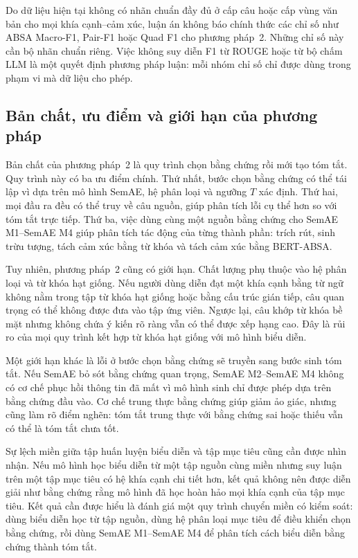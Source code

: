 Do dữ liệu hiện tại không có nhãn chuẩn đầy đủ ở cấp câu hoặc cấp vùng văn bản cho mọi khía cạnh--cảm xúc, luận án không báo chính thức các chỉ số như ABSA Macro-F1, Pair-F1 hoặc Quad F1 cho phương pháp~2. Những chỉ số này cần bộ nhãn chuẩn riêng. Việc không suy diễn F1 từ ROUGE hoặc từ bộ chấm LLM là một quyết định phương pháp luận: mỗi nhóm chỉ số chỉ được dùng trong phạm vi mà dữ liệu cho phép.

\subsection{Bản chất, ưu điểm và giới hạn của phương pháp}
\label{subsec:method2-value-limitations}

Bản chất của phương pháp~2 là quy trình chọn bằng chứng rồi mới tạo tóm tắt. Quy trình này có ba ưu điểm chính. Thứ nhất, bước chọn bằng chứng có thể tái lập vì dựa trên mô hình SemAE, hệ phân loại và ngưỡng \(T\) xác định. Thứ hai, mọi đầu ra đều có thể truy về câu nguồn, giúp phân tích lỗi cụ thể hơn so với tóm tắt trực tiếp. Thứ ba, việc dùng cùng một nguồn bằng chứng cho SemAE M1--SemAE M4 giúp phân tích tác động của từng thành phần: trích rút, sinh trừu tượng, tách cảm xúc bằng từ khóa và tách cảm xúc bằng BERT-ABSA.

Tuy nhiên, phương pháp~2 cũng có giới hạn. Chất lượng phụ thuộc vào hệ phân loại và từ khóa hạt giống. Nếu người dùng diễn đạt một khía cạnh bằng từ ngữ không nằm trong tập từ khóa hạt giống hoặc bằng cấu trúc gián tiếp, câu quan trọng có thể không được đưa vào tập ứng viên. Ngược lại, câu khớp từ khóa bề mặt nhưng không chứa ý kiến rõ ràng vẫn có thể được xếp hạng cao. Đây là rủi ro của mọi quy trình kết hợp từ khóa hạt giống với mô hình biểu diễn.

Một giới hạn khác là lỗi ở bước chọn bằng chứng sẽ truyền sang bước sinh tóm tắt. Nếu SemAE bỏ sót bằng chứng quan trọng, SemAE M2--SemAE M4 không có cơ chế phục hồi thông tin đã mất vì mô hình sinh chỉ được phép dựa trên bằng chứng đầu vào. Cơ chế trung thực bằng chứng giúp giảm ảo giác, nhưng cũng làm rõ điểm nghẽn: tóm tắt trung thực với bằng chứng sai hoặc thiếu vẫn có thể là tóm tắt chưa tốt.

Sự lệch miền giữa tập huấn luyện biểu diễn và tập mục tiêu cũng cần được nhìn nhận. Nếu mô hình học biểu diễn từ một tập nguồn cùng miền nhưng suy luận trên một tập mục tiêu có hệ khía cạnh chi tiết hơn, kết quả không nên được diễn giải như bằng chứng rằng mô hình đã học hoàn hảo mọi khía cạnh của tập mục tiêu. Kết quả cần được hiểu là đánh giá một quy trình chuyển miền có kiểm soát: dùng biểu diễn học từ tập nguồn, dùng hệ phân loại mục tiêu để điều khiển chọn bằng chứng, rồi dùng SemAE M1--SemAE M4 để phân tích cách biểu diễn bằng chứng thành tóm tắt.

